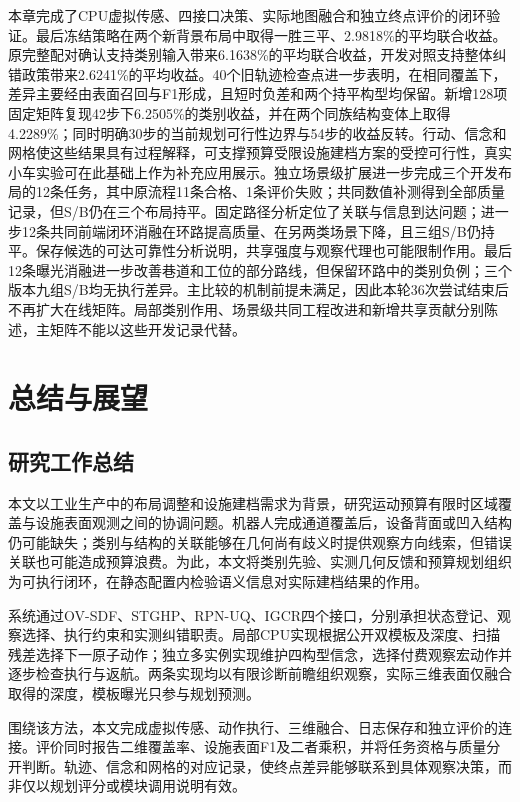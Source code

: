 \documentclass[11pt,a4paper]{article}
\numberwithin{equation}{section}
\begin{document}
本章完成了CPU虚拟传感、四接口决策、实际地图融合和独立终点评价的闭环验证。最后冻结策略在两个新背景布局中取得一胜三平、2.9818\%的平均联合收益。原完整配对确认支持类别输入带来6.1638\%的平均联合收益，开发对照支持整体纠错政策带来2.6241\%的平均收益。40个旧轨迹检查点进一步表明，在相同覆盖下，差异主要经由表面召回与F1形成，且短时负差和两个持平构型均保留。新增128项固定矩阵复现42步下6.2505\%的类别收益，并在两个同族结构变体上取得4.2289\%；同时明确30步的当前规划可行性边界与54步的收益反转。行动、信念和网格使这些结果具有过程解释，可支撑预算受限设施建档方案的受控可行性，真实小车实验可在此基础上作为补充应用展示。独立场景级扩展进一步完成三个开发布局的12条任务，其中原流程11条合格、1条评价失败；共同数值补测得到全部质量记录，但S/B仍在三个布局持平。固定路径分析定位了关联与信息到达问题；进一步12条共同前端闭环消融在环路提高质量、在另两类场景下降，且三组S/B仍持平。保存候选的可达可靠性分析说明，共享强度与观察代理也可能限制作用。最后12条曝光消融进一步改善巷道和工位的部分路线，但保留环路中的类别负例；三个版本九组S/B均无执行差异。主比较的机制前提未满足，因此本轮36次尝试结束后不再扩大在线矩阵。局部类别作用、场景级共同工程改进和新增共享贡献分别陈述，主矩阵不能以这些开发记录代替。

\hypertarget{ux603bux7ed3ux4e0eux5c55ux671b}{%
\clearpage
\section{总结与展望}\label{ux603bux7ed3ux4e0eux5c55ux671b}}

\hypertarget{ux7814ux7a76ux5de5ux4f5cux603bux7ed3}{%
\subsection{研究工作总结}\label{ux7814ux7a76ux5de5ux4f5cux603bux7ed3}}

本文以工业生产中的布局调整和设施建档需求为背景，研究运动预算有限时区域覆盖与设施表面观测之间的协调问题。机器人完成通道覆盖后，设备背面或凹入结构仍可能缺失；类别与结构的关联能够在几何尚有歧义时提供观察方向线索，但错误关联也可能造成预算浪费。为此，本文将类别先验、实测几何反馈和预算规划组织为可执行闭环，在静态配置内检验语义信息对实际建档结果的作用。

系统通过OV-SDF、STGHP、RPN-UQ、IGCR四个接口，分别承担状态登记、观察选择、执行约束和实测纠错职责。局部CPU实现根据公开双模板及深度、扫描残差选择下一原子动作；独立多实例实现维护四构型信念，选择付费观察宏动作并逐步检查执行与返航。两条实现均以有限诊断前瞻组织观察，实际三维表面仅融合取得的深度，模板曝光只参与规划预测。

围绕该方法，本文完成虚拟传感、动作执行、三维融合、日志保存和独立评价的连接。评价同时报告二维覆盖率、设施表面F1及二者乘积，并将任务资格与质量分开判断。轨迹、信念和网格的对应记录，使终点差异能够联系到具体观察决策，而非仅以规划评分或模块调用说明有效。
\end{document}
